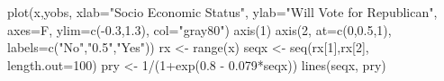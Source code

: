 \begin{Schunk}
\begin{Sinput}
 plot(x,yobs, xlab="Socio Economic Status", ylab="Will Vote for Republican", axes=F, ylim=c(-0.3,1.3), col="gray80")
 axis(1)
 axis(2, at=c(0,0.5,1), labels=c("No","0.5","Yes"))
 rx <- range(x)
 seqx <- seq(rx[1],rx[2], length.out=100)
 pry <- 1/(1+exp(0.8 - 0.079*seqx))
 lines(seqx, pry)
\end{Sinput}
\end{Schunk}
